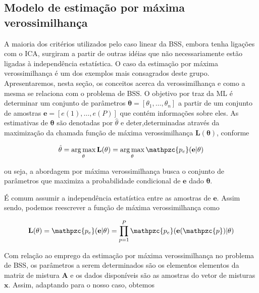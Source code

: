 \subsection{Modelo de estimação por máxima verossimilhança}

    A maioria dos critérios utilizados pelo caso linear da BSS, embora tenha ligações com o ICA, surgiram a partir de outras idéias que não necessariamente estão ligadas à independência estatística. O caso da estimação por máxima verossimilhança é um dos exemplos mais consagrados deste grupo. Apresentaremos, nesta seção, os conceitos acerca da verossimilhança e como a mesma se relaciona com o problema de BSS. 
    O objetivo por traz da ML é determinar um conjunto de parâmetros $\mathbf{\theta} = [\theta_1, \dots, \theta_n]$ a partir de um conjunto de amostras $\mathbf{e} = [e(1), \dots, e(P)]$ que contém informações sobre eles. As estimativas de $\mathbf{\theta}$ são denotadas por $\hat{\theta}$ e deter,determinadas através da maximização da chamada função de máxima verossimilhança $\mathbf{L(\theta)}$, conforme
    
    \begin{equation}\label{eq:argmax}
    \hat{\theta} = \operatorname*{arg\,max}_{\theta} \mathbf{L(\theta)}
    = \operatorname*{arg\,max}_{\theta}
    \mathpzc{p_e}(\mathbf{e} | \mathbf{\theta})
    \end{equation}
    
    \medskip
    
    ou seja, a abordagem por máxima verossimilhança busca o conjunto de parâmetros que maximiza a probabilidade condicional de $\mathbf{e}$ dado $\mathbf{\theta}$.
    
    É comum assumir a independência estatística entre as amostras de $\mathbf{e}$. Assim sendo, podemos reescrever a função de máxima verossimilhança como
    
    \begin{equation}\label{eq:argmax2}
        \mathbf{L(\theta)}
        =\mathpzc{p_e}(\mathbf{e} | \mathbf{\theta})
        =\prod_{p=1}^P \mathpzc{p_e}(\mathbf{e}(\mathpzc{p}) | \mathbf{\theta})
    \end{equation}

    Com relação ao emprego da estimação por máxima verossimilhança no problema de BSS, os parâmetros a serem determinados são os elementos elementos da matriz de mistura $\mathbf{A}$ e os dados disponíveis são as amostras do vetor de misturas $\mathbf{x}$. Assim, adaptando para o nosso caso, obtemos
    
